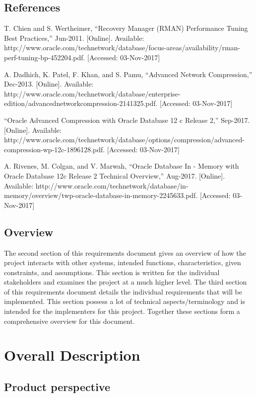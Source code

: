 \documentclass[10pt]{article}
\begin{document}
\subsection{References}

\begin{flushleft}
T. Chien and S. Wertheimer, “Recovery Manager (RMAN) Performance Tuning Best Practices,” Jun-2011. [Online]. Available: http://www.oracle.com/technetwork/database/focus-areas/availability/rman-perf-tuning-bp-452204.pdf. [Accessed: 03-Nov-2017] \hfill \break

A. Dadhich, K. Patel, F. Khan, and S. Pamu, “Advanced Network Compression,” Dec-2013. [Online]. Available: http://www.oracle.com/technetwork/database/enterprise-edition/advancednetworkcompression-2141325.pdf. [Accessed: 03-Nov-2017] \hfill \break

“Oracle Advanced Compression with Oracle Database 12 c Release 2,” Sep-2017. [Online]. Available: http://www.oracle.com/technetwork/database/options/compression/advanced-compression-wp-12c-1896128.pdf. [Accessed: 03-Nov-2017] \hfill \break

A. Rivenes, M. Colgan, and V. Marwah, “Oracle Database In - Memory with Oracle Database 12c Release 2 Technical Overview,” Aug-2017. [Online]. Available: http://www.oracle.com/technetwork/database/in-memory/overview/twp-oracle-database-in-memory-2245633.pdf. [Accessed: 03-Nov-2017] \hfill \break
\end{flushleft}


\subsection{Overview}

The second section of this requirements document gives an overview of how the project interacts with other systems, intended functions, characteristics, given constraints, and assumptions. This section is written for the individual stakeholders and examines the project at a much higher level. The third section of this requirements document details the individual requirements that will be implemented. This section possess a lot of technical aspects/terminology and is intended for the implementers for this project. Together these sections form a comprehensive overview for this document.


\section{Overall Description}
\subsection{Product perspective}
\end{document}
